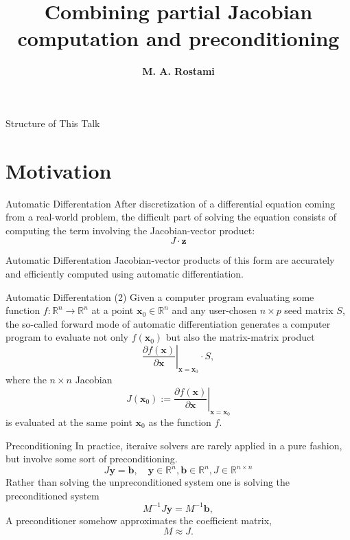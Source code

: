 \documentclass{beamer}
\title[]
{Combining partial Jacobian computation and preconditioning}
\author[\textbf{Rostami}]{{\bf M. A. Rostami}}
\institute[FSU Jena]{
  Chair of Advanced Computing\\
  Friedrich Schiller University Jena, Germany\\[1ex]
  \texttt{a.rostami@uni-jena.de}
}
\newcommand{\vek}[1]{{\ensuremath{\mathbf #1}}}
\newcommand{\R}{\ensuremath{\field{R}}}
\newcommand{\field}[1]{\mathbb{#1}}
\begin{document}
\begin{frame}[plain]
  \titlepage
\end{frame}

\begin{frame}{Structure of This Talk}
\tableofcontents
\end{frame}

\section{Motivation}
\begin{frame}{Automatic Differentation}
After discretization of a differential equation coming from a real-world problem,
the difficult part of solving the equation consists of computing the term involving the
Jacobian-vector product:
\begin{equation*}
J\cdot \vek{z}
\end{equation*}
\begin{block}{Automatic Differentation}
Jacobian-vector products of this form are accurately and efficiently computed using
automatic differentiation.
\end{block}

\end{frame}

\begin{frame}{Automatic Differentation (2)}
Given a computer program evaluating some function $f: \R^n \rightarrow
\R^n$ at a point $\vek{x}_0\in \R^n$ and any user-chosen $n \times p$ seed matrix $S$,
the so-called forward mode of automatic differentiation generates a computer program to
evaluate not only $f(\vek{x}_0)$ but also the matrix-matrix product
$$
\left.\frac{\partial f(\vek{x})}{\partial \vek{x}}\right|_{\vek{x}=\vek{x}_0} \cdot S,
$$
where the $n \times n$ Jacobian
$$
J(\vek{x}_0) := \left.\frac{\partial f(\vek{x})}{\partial \vek{x}}\right|_{\vek{x}=\vek{x}_0}
$$
is evaluated at the same point $\vek{x}_0$ as the function $f$.
\end{frame}

\begin{frame}{Preconditioning}
In practice,
iteraive solvers are rarely applied in a pure fashion, but involve some sort of
preconditioning.
$$J \vek{y}=\vek{b},\quad \vek{y} \in \R^n, \vek{b} \in \R^n, J \in \R^{n \times n}$$
Rather than solving the unpreconditioned system
 one is solving the preconditioned system
$$M^{-1} J \vek{y}= M^{-1}\vek{b},$$
A preconditioner somehow approximates the coefficient matrix,
$$M \approx J.$$
\end{frame}
\end{document}
